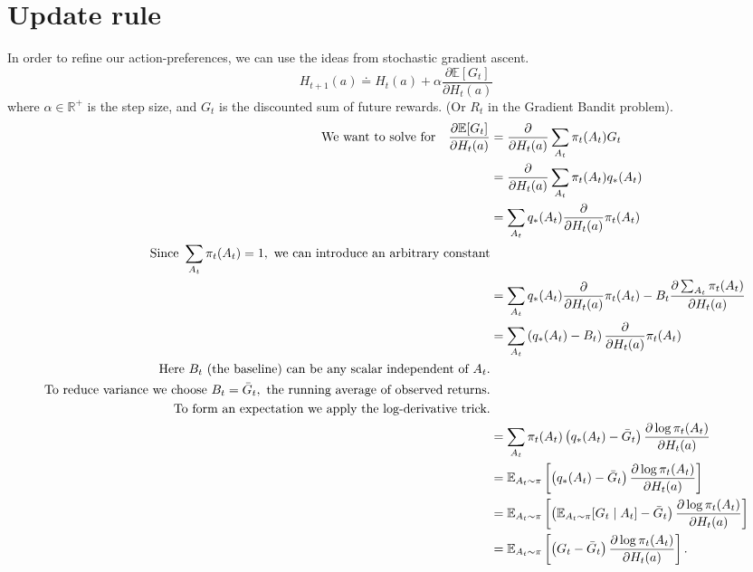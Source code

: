 \documentclass{article}
\begin{document}
\section{Update rule} \label{sec:update-rule}
In order to refine our action-preferences, we can use the ideas from stochastic gradient ascent.
\begin{equation}
    H_{t+1}(a) \doteq H_t(a) + \alpha \frac{\partial \mathbb E[G_t]}{\partial H_t(a)}
\end{equation}
where $\alpha \in \mathbb R^+$ is the step size, and $G_t$ is the discounted sum of future rewards. (Or $R_t$ in the Gradient Bandit problem).
\begin{align}
\text{We want to solve for} \quad 
\frac{\partial \mathbb E[G_t]}{\partial H_t(a)}
&= \frac{\partial }{\partial H_t(a)} \sum_{A_t} \pi_t(A_t) G_t \notag \\
&= \frac{\partial }{\partial H_t(a)} \sum_{A_t} \pi_t(A_t) q_*(A_t) \notag \\
&= \sum_{A_t} q_*(A_t)\frac{\partial }{\partial H_t(a)}  \pi_t(A_t) \notag \\
\text{Since } \sum_{A_t} \pi_t(A_t) = 1,\text{ we can introduce an arbitrary constant} 
& \notag \\
&= \sum_{A_t} q_*(A_t)\frac{\partial }{\partial H_t(a)} \pi_t(A_t)
     - B_t \frac{\partial \sum_{A_t} \pi_t(A_t)}{\partial H_t(a)} \notag \\
&= \sum_{A_t} \left( q_*(A_t) - B_t \right)
     \frac{\partial }{\partial H_t(a)} \pi_t(A_t)
     \label{baseline-eqn} \\
\text{Here } B_t \text{ (the baseline) can be any scalar independent of } A_t.
& \notag \\
\text{To reduce variance we choose } B_t = \bar G_t,
\text{ the running average of observed returns.}
& \notag \\
\text{To form an expectation we apply the log-derivative trick.}
& \notag \\
&= \sum_{A_t} \pi_t(A_t)
   \left( q_*(A_t) - \bar G_t \right)
   \frac{\partial \log \pi_t(A_t)}{\partial H_t(a)} \notag \\
&= \mathbb E_{A_t \sim \pi}
   \left[
   \left( q_*(A_t) - \bar G_t \right)
   \frac{\partial \log \pi_t(A_t)}{\partial H_t(a)}
   \right] \notag \\
&= \mathbb E_{A_t \sim \pi}
   \left[
   \left(
   \mathbb E_{A_t \sim \pi}[G_t \mid A_t] - \bar G_t
   \right)
   \frac{\partial \log \pi_t(A_t)}{\partial H_t(a)}
   \right] \notag \\
&= \mathbb E_{A_t \sim \pi}
   \left[
   \left( G_t - \bar G_t \right)
   \frac{\partial \log \pi_t(A_t)}{\partial H_t(a)}
   \right].
\end{align}
\end{document}
